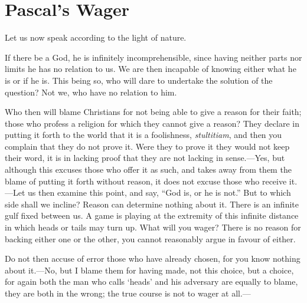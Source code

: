 
\author{Blaise Pascal}
\chapter{Pascal's Wager}

\noindent Let us now speak according to the light of nature.

If there be a God, he is infinitely incomprehensible, since having
neither parts nor limits he has no relation to us. We are then
incapable of knowing either what he is or if he is. This being so, who
will dare to undertake the solution of the question? Not we, who have
no relation to him.

Who then will blame Christians for not being able to give a reason for
their faith; those who profess a religion for which they cannot give a
reason? They declare in putting it forth to the world that it is a
foolishness, \textit{stultitiam}, and then you complain that they do
not prove it. Were they to prove it they would not keep their word, it
is in lacking proof that they are not lacking in sense.---Yes, but
although this excuses those who offer it as such, and takes away from
them the blame of putting it forth without reason, it does not excuse
those who receive it.---Let us then examine this point, and say, ``God
is, or he is not.'' But to which side shall we incline? Reason can
 determine nothing about it. There is an infinite gulf fixed
between us. A game is playing at the extremity of this infinite
distance in which heads or tails may turn up. What will you wager?
There is no reason for backing either one or the other, you cannot
reasonably argue in favour of either.

Do not then accuse of error those who have already chosen, for you
know nothing about it.---No, but I blame them for having made, not
this choice, but a choice, for again both the man who calls `heads'
and his adversary are equally to blame, they are both in the wrong;
the true course is not to wager at all.---

